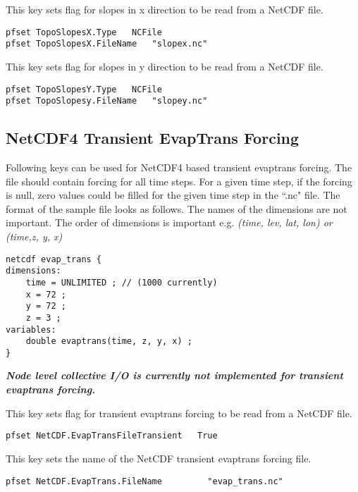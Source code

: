 {This key sets flag for slopes in x direction to be read from a NetCDF file.}
\begin{display}\begin{verbatim}
pfset TopoSlopesX.Type   NCFile
pfset TopoSlopesX.FileName   "slopex.nc"
\end{verbatim}\end{display}
{This key sets flag for slopes in y direction to be read from a NetCDF file.}
\begin{display}\begin{verbatim}
pfset TopoSlopesY.Type   NCFile
pfset TopoSlopesy.FileName   "slopey.nc"
\end{verbatim}\end{display}

\subsection{NetCDF4 Transient EvapTrans Forcing}
Following keys can be used for NetCDF4 based transient evaptrans forcing. The file should contain forcing for all time steps. For a given time step, if the forcing is null, zero values could be filled for the given time step in the ``.nc" file. The format of the sample file looks as follows. The names of the dimensions are not important. The order of dimensions is important e.g. \textit{(time, lev, lat, lon) or (time,z, y, x)}
\begin{display}\begin{verbatim}
netcdf evap_trans {
dimensions:
	time = UNLIMITED ; // (1000 currently)
	x = 72 ;
	y = 72 ;
	z = 3 ;
variables:
	double evaptrans(time, z, y, x) ;
}
\end{verbatim}\end{display}
\textit{\textbf{Node level collective I/O is currently not implemented for transient evaptrans forcing.}}

{This key sets flag for transient evaptrans forcing to be read from a NetCDF file.}
\begin{display}\begin{verbatim}
pfset NetCDF.EvapTransFileTransient   True
\end{verbatim}\end{display}

{This key sets the name of the NetCDF transient evaptrans forcing file.}
\begin{display}\begin{verbatim}
pfset NetCDF.EvapTrans.FileName         "evap_trans.nc"
\end{verbatim}\end{display}

